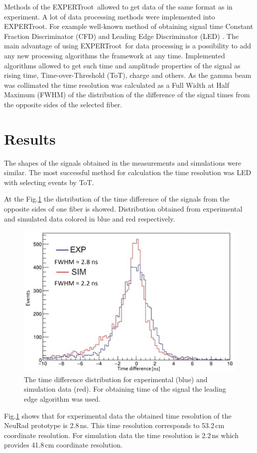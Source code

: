 \documentclass{webofc}
\newcommand{\er}{\textmd{EXPERTroot}}
\begin{document}
Methods of the \er\, allowed to get data of the same format as in experiment. 
A lot of data processing methods were implemented into \er. For example well-known method of obtaining signal time Constant Fraction Discriminator (CFD) and Leading Edge Discriminator (LED) \cite{diplom}.
The main advantage of using \er\, for data processing is a possibility to add any new processing algorithms the framework at any time. 
Implemented algorithms allowed to get such time and amplitude properties of the signal as rising time, Time-over-Threshold (ToT), charge and others. 
As the gamma beam was collimated the time resolution was calculated as a Full Width at Half Maximum (FWHM) of the distribution of the difference of the signal times from the opposite sides of the selected fiber. 

\section{Results}
The shapes of the signals obtained in the measurements and simulations were similar. 
The most successful method for calculation the time resolution was LED with selecting events by ToT.

At the Fig.\ref{ris:tausim} the distribution of the time difference of the signals from the opposite sides of one fiber is showed. Distribution obtained from experimental and simulated data colored in blue and red respectively.

\begin{figure}[h]
	\centering
	\includegraphics[width=0.8\linewidth]{tausim.png}
	\caption{The time difference distribution for experimental (blue) and simulation data (red). For obtaining time of the signal the leading edge algorithm was used.}\label{ris:tausim}
\end{figure}

Fig.\ref{ris:tausim} shows that for experimental data the obtained time resolution of the NeuRad prototype is 2.8\,ns. This time resolution corresponds to 53.2\,cm coordinate resolution. For simulation data the time resolution is 2.2\,ns which provides 41.8\,cm coordinate resolution.  
\end{document}
